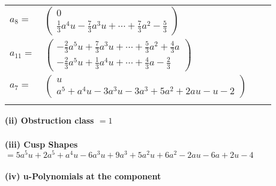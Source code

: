\documentclass[1p]{elsarticle_modified}
\theoremstyle{definition}
\begin{document}
\begin{tabular}{m{7pt} m{180pt} m{7pt} m{180pt} }
\flushright $a_{8}=$&$\begin{pmatrix}0\\\frac{1}{3} a^4 u-\frac{7}{3} a^3 u+\cdots+\frac{7}{3} a^2-\frac{5}{3}\end{pmatrix}$ \\
\flushright $a_{11}=$&$\begin{pmatrix}-\frac{2}{3} a^5 u+\frac{7}{3} a^3 u+\cdots+\frac{5}{3} a^2+\frac{4}{3} a\\-\frac{2}{3} a^5 u+\frac{1}{3} a^4 u+\cdots+\frac{4}{3} a-\frac{2}{3}\end{pmatrix}$ \\
\flushright $a_{7}=$&$\begin{pmatrix}u\\a^5+a^4 u-3 a^3 u-3 a^3+5 a^2+2 a u- u-2\end{pmatrix}$\\&\end{tabular}
\flushleft \textbf{(ii) Obstruction class $= 1$}\\~\\
\flushleft \textbf{(iii) Cusp Shapes $= 5 a^5 u+2 a^5+a^4 u-6 a^3 u+9 a^3+5 a^2 u+6 a^2-2 a u-6 a+2 u-4$}\\~\\
\newpage\renewcommand{\arraystretch}{1}
\flushleft \textbf{(iv) u-Polynomials at the component}\newline \\
\end{document}
